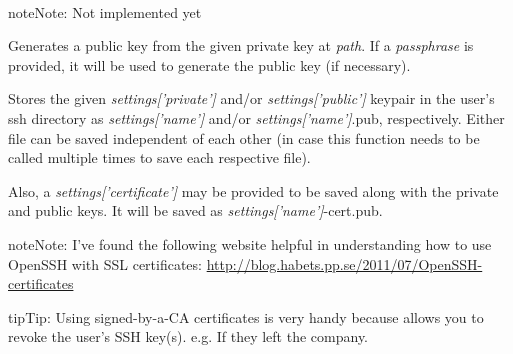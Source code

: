 \documentclass[letterpaper,10pt,openany]{sphinxmanual}
\begin{document}

\begin{fulllineitems}
\label{Applications/terminal/plugin_ssh:ssh.dropbear_generate_new_keypair}~
\begin{notice}{note}{Note:}
Not implemented yet
\end{notice}

\end{fulllineitems}


\begin{fulllineitems}
\label{Applications/terminal/plugin_ssh:ssh.openssh_generate_public_key}
Generates a public key from the given private key at \emph{path}.  If a
\emph{passphrase} is provided, it will be used to generate the public key (if
necessary).

\end{fulllineitems}


\begin{fulllineitems}
\label{Applications/terminal/plugin_ssh:ssh.store_id_file}
Stores the given \emph{settings{[}'private'{]}} and/or \emph{settings{[}'public'{]}} keypair
in the user's ssh directory as \emph{settings{[}'name'{]}} and/or
\emph{settings{[}'name'{]}}.pub, respectively.  Either file can be saved independent
of each other (in case this function needs to be called multiple times to
save each respective file).

Also, a \emph{settings{[}'certificate'{]}} may be provided to be saved along
with the private and public keys.  It will be saved as
\emph{settings{[}'name'{]}}-cert.pub.

\begin{notice}{note}{Note:}
I've found the following website helpful in understanding how to use
OpenSSH with SSL certificates:
\href{http://blog.habets.pp.se/2011/07/OpenSSH-certificates}{http://blog.habets.pp.se/2011/07/OpenSSH-certificates}
\end{notice}

\begin{notice}{tip}{Tip:}
Using signed-by-a-CA certificates is very handy because allows you to
revoke the user's SSH key(s).  e.g. If they left the company.
\end{notice}

\end{fulllineitems}
\end{document}
